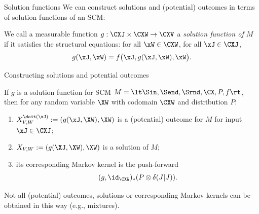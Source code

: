 \begin{frame}{Solution functions}
We can construct solutions and (potential) outcomes in terms of solution functions of an SCM:
\begin{Def}\label{def:scm_solution_functions}
  We call a measurable function
  $g : \CXJ \times \CXW \to \CXV$ a \emph{solution function of $M$} if it satisfies the structural equations:
  for all $\xW\in\CXW$, for all $\xJ\in\CXJ$,
  $$g(\xJ,\xW) = f\big(\xJ, g(\xJ,\xW), \xW\big).$$
\end{Def}
\end{frame}

\begin{frame}{Constructing solutions and potential outcomes}
\begin{Rem}
  If $g$ is a solution function for SCM $M = \lt \Sin, \Send, \Srnd, \CX, P, f \rt$,
  then for any random variable $\XW$ with codomain $\CXW$ and distribution $P$:
  \begin{enumerate}
    \item
      $X_{V,W}^{\doit(\xJ)} := (g(\xJ, \XW),\XW)$ is a (potential) outcome for $M$ for input $\xJ\in\CXJ$;
    \item
      $X_{V,W} := (g(\XJ, \XW),\XW)$ is a solution of $M$;
    \item its corresponding Markov kernel is the push-forward
      $$(g,\id_{\CXW})_* (P \otimes \delta(J|J)).$$
  \end{enumerate}
\end{Rem}
Not all (potential) outcomes, solutions or corresponding Markov kernels can be obtained in this way (e.g., mixtures).
\end{frame}

